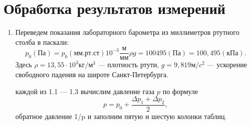 \documentclass[12pt]{article}
\begin{document}
\section*{Обработка результатов измерений}
\begin{enumerate}
\item	Переведем показания лабораторного барометра из миллиметров ртутного столба в паскали:
\begin{equation}
p_{0}(Па)= p_{0}(мм.рт.ст) 10^{-3} \frac{м}{мм} \rho g = 100495 (Па) = 100,495(кПа).
\end{equation}
Здесь $\rho = 13,55 \cdot 10^3  кг/м^3$ --- плотность ртути, $g = 9,819 м/c^2$ --- ускорение свободного падения на широте Санкт-Петербурга.

 каждой из 1.1 — 1.3  вычислим давление газа $p$ по формуле 
 \begin{equation}
p=p_{0} + \frac{\Delta p_{1} + \Delta p_{2}}{2} ,
\end{equation}
обратное давление 1/p и заполним пятую и шестую колонки таблиц.


\end{enumerate}
\end{document}

